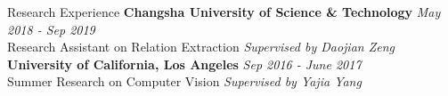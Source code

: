 \documentclass{resume} %
\begin{document}
\begin{rSection}{Research Experience}
    {\bf Changsha University of Science \& Technology} \hfill {\em May 2018 - Sep 2019} 
\\ Research Assistant on Relation Extraction \hfill {\em Supervised by Daojian Zeng}
\\{\bf University of California, Los Angeles} \hfill {\em Sep 2016 - June 2017} 
\\ Summer Research on Computer Vision \hfill {\em Supervised by Yajia Yang}
\end{rSection}
\end{document}
